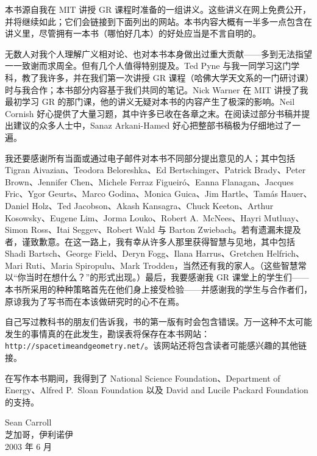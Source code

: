 本书源自我在 MIT 讲授 GR 课程时准备的一组讲义。这些讲义在网上免费公开，并将继续如此；它们会链接到下面列出的网站。本书内容大概有一半多一点包含在讲义里，尽管拥有一本书（哪怕好几本）的好处应当是不言自明的。

无数人对我个人理解广义相对论、也对本书本身做出过重大贡献——多到无法指望一一致谢而求周全。但有几个人值得特别提及。Ted Pyne 与我一同学习这门学科，教了我许多，并在我们第一次讲授 GR 课程（哈佛大学天文系的一门研讨课）时与我合作；本书部分内容基于我们共同的笔记。Nick Warner 在 MIT 讲授了我最初学习 GR 的那门课，他的讲义无疑对本书的内容产生了极深的影响。Neil Cornish 好心提供了大量习题，其中许多已收在各章之末。在阅读过部分书稿并提出建议的众多人士中，Sanaz Arkani-Hamed 好心把整部书稿极为仔细地过了一遍。

我还要感谢所有当面或通过电子邮件对本书不同部分提出意见的人；其中包括 Tigran Aivazian、Teodora Beloreshka、Ed Bertschinger、Patrick Brady、Peter Brown、Jennifer Chen、Michele Ferraz Figueiró、Eanna Flanagan、Jacques Fric、Ygor Geurts、Marco Godina、Monica Guica、Jim Hartle、Tamás Hauer、Daniel Holz、Ted Jacobson、Akash Kansagra、Chuck Keeton、Arthur Kosowsky、Eugene Lim、Jorma Louko、Robert A.~McNees、Hayri Mutluay、Simon Ross、Itai Seggev、Robert Wald 与 Barton Zwiebach。若有遗漏未提及者，谨致歉意。在这一路上，我有幸从许多人那里获得智慧与见地，其中包括 Shadi Bartsch、George Field、Deryn Fogg、Ilana Harrus、Gretchen Helfrich、Mari Ruti、Maria Spiropulu、Mark Trodden，当然还有我的家人。（这些智慧常以“你当时在想什么？”的形式出现。）最后，我要感谢我 GR 课堂上的学生们——本书所采用的种种策略首先在他们身上接受检验——并感谢我的学生与合作者们，原谅我为了写书而在本该做研究时的心不在焉。

自己写过教科书的朋友们告诉我，书的第一版有时会包含错误。万一这种不太可能发生的事情真的在此发生，勘误表将保存在本书网站：\texttt{http://spacetimeandgeometry.net/}。该网站还将包含读者可能感兴趣的其他链接。

在写作本书期间，我得到了 National Science Foundation、Department of Energy、Alfred P.~Sloan Foundation 以及 David and Lucile Packard Foundation 的支持。

\begin{flushright}
Sean Carroll\\
芝加哥，伊利诺伊\\
2003 年 6 月
\end{flushright}
